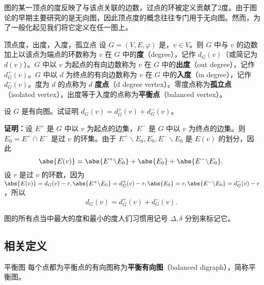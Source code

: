 

\cite{graph2}图的某一顶点的度反映了与该点关联的边数，过点的环被定义贡献了2度。由于图论的早期主要研究的是无向图，因此顶点度的概念往往专门用于无向图。然而，为了一般化起见我们将它定义在任一图上。

\begin{definition}{顶点度，出度，入度，孤立点}\label{def_DGraph_1}
设 $G=(V,E,\varphi)$ 是，$v\in V$。则 $G$ 中与 $v$ 的边数加上以该点为端点的环数称为 $v$ 在 $G$ 中的\textbf{度}（degree），记作 $d_G(v)$（或简记为 $d(v)$）。$G$ 中以 $v$ 为起点的有向边数称为 $v$ 在 $G$ 中的\textbf{出度}（out degree），记作 $d_G^+(v)$。$G$ 中以 $d$ 为终点的有向边数称为 $v$ 在 $G$ 中的\textbf{入度}（in degree），记作 $d_G^-(v)$。度为 $d$ 的点称为 $d$ \textbf{度点}（d degree vertex）。零度点称为\textbf{孤立点}（isolated vertex），出度等于入度的点称为\textbf{平衡点}（balanced vertex）。
\end{definition}

\begin{example}{}
设 $G$ 是有向图。试证明 $d_G(v)=d_G^+(v)+d_G^-(v)$。

\textbf{证明：}设 $E^+$ 是 $G$ 中以 $v$ 为起点的边集，$E^-$ 是 $G$ 中以 $v$ 为终点的边集。则 $E_0=E^+\cap E^-$ 是过 $v$ 的环集。由于
$E^+\backslash E_0, E_0, E^-\backslash E_0$ 是 $E(v)$ 的划分，因此
\begin{equation}
\abs{E(v)}=\abs{E^+\backslash E_0}+\abs{E_0}+\abs{E^-\backslash E_0}.~
\end{equation}
设 $r$ 是过 $v$ 的环数，因为 $\abs{E(v)}=d_G(v)-r,\abs{E^+\backslash E_0}=d_G^+(v)-r, \abs{E_0}=r, \abs{E^-\backslash E_0}=d_G^-(v)-r$，所以
\begin{equation}
d_G(v)=d_G^+(v)+d_G^-(v).~
\end{equation}
\end{example}
图的所有点当中最大的度和最小的度人们习惯用记号 $\Delta,\delta$ 分别来标记它。
\subsection{相关定义}

\begin{definition}{平衡图}\label{def_DGraph_2}
每个点都为平衡点的有向图称为\textbf{平衡有向图}（balanced digraph），简称平衡图。
\end{definition}


